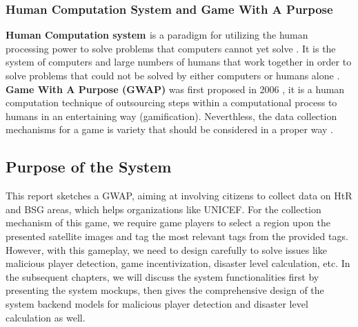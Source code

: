 \subsubsection{Human Computation System and Game With A Purpose}


\textbf{Human Computation system \label{idx:hc}} is a paradigm for utilizing the human processing power to solve problems 
that computers cannot yet solve \cite{quinn2011human}.
It is the system of computers and large numbers of humans that work together in order to solve problems 
that could not be solved by either computers or humans alone \cite{quinn2009taxonomy}.
\textbf{Game With A Purpose (GWAP)\label{idx:gwap}} was first proposed in 2006 \cite{von2006games}, it
is a human computation technique of outsourcing steps 
within a computational process to humans in an entertaining way (gamification). 
Neverthless, the data collection mechanisms for a game is variety that should be considered in a proper way \cite{von2008designing}.

\subsection{Purpose of the System}

This report sketches a GWAP, aiming at involving citizens to collect data on HtR and BSG \cite{unicef2017report} areas, 
which helps organizations like UNICEF. For the collection mechanism of this game, 
we require game players to select a region upon
the presented satellite images and tag the most relevant tags from the provided tags.
However, with this gameplay, we need to design carefully to solve issues like malicious player detection,
game incentivization, disaster level calculation, etc.
In the subsequent chapters, we will discuss the system functionalities first by presenting the system mockups, 
then gives the comprehensive design of the system backend models for malicious player detection
and disaster level calculation as well. 

